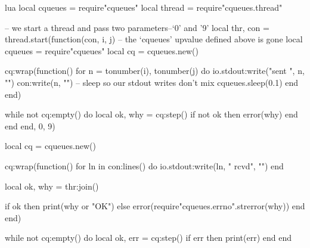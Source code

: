 \documentclass[11pt, oneside]{memoir}
\begin{document}
\begin{example}{lua}
local cqueues = require"cqueues"
local thread = require"cqueues.thread"

-- we start a thread and pass two parameters--`0' and '9'
local thr, con = thread.start(function(con, i, j)
	-- the `cqueues' upvalue defined above is gone
	local cqueues = require"cqueues"
	local cq = cqueues.new()

	cq:wrap(function()
		for n = tonumber(i), tonumber(j) do
			io.stdout:write("sent ", n, "\n")
			con:write(n, "\n")
			 -- sleep so our stdout writes don't mix
			cqueues.sleep(0.1)
		end
	end)

	while not cq:empty() do
		local ok, why = cq:step()
		if not ok then error(why) end
	end
end, 0, 9)


local cq = cqueues.new()

cq:wrap(function()
	for ln in con:lines() do
		io.stdout:write(ln, " rcvd", "\n")
	end

	local ok, why = thr:join()

	if ok then
		print(why or "OK")
	else
		error(require"cqueues.errno".strerror(why))
	end
end)

while not cq:empty() do
	local ok, err = cq:step()
	if err then print(err) end
end
\end{example}



\appendix
\printindex
\end{document}
